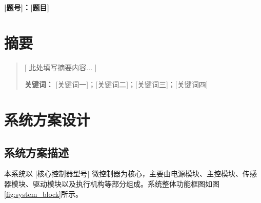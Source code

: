 \documentclass[zihao=-4,fontset=none]{ctexart}
\begin{document}
\begin{center}
    \huge \bfseries [题号]：[题目]
    \vspace{1cm}
\end{center}

\section*{摘要}
\begin{quote}
    \noindent
    [ 此处填写摘要内容... ]

    \vspace{1cm}
    \noindent
    \textbf{关键词：} [关键词一]；[关键词二]；[关键词三]；[关键词四] %
\end{quote}

\newpage
\tableofcontents
\newpage


\section{系统方案设计}
\subsection{系统方案描述}
    本系统以 [核心控制器型号] 微控制器为核心，主要由电源模块、主控模块、传感器模块、驱动模块以及执行机构等部分组成。系统整体功能框图如图\ref{fig:system_block}所示。
    
\end{document}
